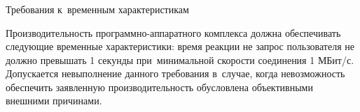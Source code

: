 \subsubsection{} Требования к~временным характеристикам
\label{sec:analysis:research:req:timing}

Производительность программно-аппаратного комплекса должна обеспечивать следующие временные характеристики: время реакции не запрос пользователя не должно превышать 1 секунды при~минимальной скорости соединения 1 МБит/с. Допускается невыполнение данного требования в~случае, когда невозможность обеспечить заявленную производительность обусловлена объективными внешними причинами.
